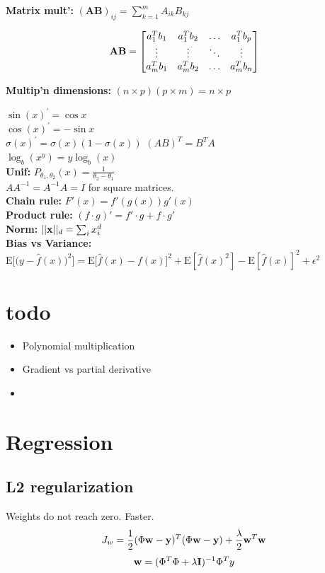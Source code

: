 {\bf Matrix mult': } $ (\mathbf{A}\mathbf{B})_{ij} = \sum_{k=1}^m A_{ik}B_{kj}\,$

$$ \mathbf{AB} =  \begin{bmatrix}
         a_1^Tb_1&  a_1^T b_2 & \hdots & a_1^T b_p \\
         \vdots & \vdots  & \ddots  & \vdots \\
          a_m^T b_1 & a_m^T b_2 & \hdots & a_m^T b_n \\
         \end{bmatrix}
$$

{\bf Multip'n dimensions: } $(n \times p)(p \times m) = n \times p$

$\sin(x)^{'} = \cos{x}$ \\
$\cos(x)^{'} = -\sin{x}$\\
$\sigma(x)^{'} = \sigma(x)(1-\sigma(x))$
$(AB)^{T} = B^{T}A$\\
$\log_{b}(x^{y}) = y \log_{b}(x)$\\
{\bf Unif: } $P_{\theta_1, \theta_2}(x) = \frac{1}{\theta_2 - \theta_1}$ \\
$AA^{-1} = A^{-1}A = I$ for square matrices. \\
{\bf Chain rule: } $F'(x) = f'(g(x)) g'(x)$ \\
{\bf Product rule: } $(f\cdot g)'=f'\cdot g+f\cdot g' \,\!$ \\
{\bf Norm: } $\vert \vert \mathbf{x} \vert \vert_{d} = \sum_{i} x_{i}^{d}$ \\
{\bf Bias vs Variance: } $\mathrm{E}\Big[\big(y - \hat{f}(x)\big)^2\Big] = \mathrm{E}\big[\hat{f}(x) - f(x)\big]^2 + \mathrm{E}[\hat{f}(x)^2] - \mathrm{E}[\hat{f}(x)]^2 + \epsilon^2$

\section{todo}
\begin{itemize}
\item Polynomial multiplication
\item Gradient vs partial derivative
\item 
\end{itemize}


\section{Regression}
\subsection{L2 regularization}
Weights do not reach zero. Faster.
$$J_w = \frac{1}{2}(\Phi\mathbf{w} - \mathbf{y})^T(\Phi \mathbf{w} - \mathbf{y}) + \frac{\lambda}{2}\mathbf{w}^T\mathbf{w}$$
$$\mathbf{w} = (\Phi^T\Phi + \lambda \mathbf{I})^{-1}\Phi^Ty$$
